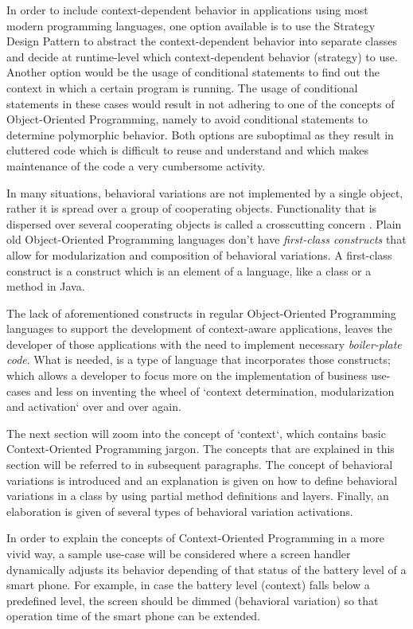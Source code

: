 \documentclass{acm_proc_article-sp}
\begin{document}
In order to include context-dependent behavior in applications using most modern programming languages, one option available is to use the Strategy Design Pattern to abstract the context-dependent behavior into separate classes and decide at runtime-level which context-dependent behavior (strategy) to use. Another option would be the usage of conditional statements to find out the context in which a certain program is running. The usage of conditional statements in these cases would result in not adhering to one of the concepts of Object-Oriented Programming, namely to avoid conditional statements to determine polymorphic behavior. Both options are suboptimal as they result in cluttered code which is difficult to reuse and understand and which makes maintenance of the code a very cumbersome activity.

In many situations, behavioral variations are not implemented by a single object, rather it is spread over a group of cooperating objects. Functionality that is dispersed over several cooperating objects is called a crosscutting concern \cite{kiczalesetallaop}. Plain old Object-Oriented Programming languages don't have \textit{first-class constructs} that allow for modularization and composition of behavioral variations. A first-class construct \cite{Keays:2003:CP:940923.940926} is a construct which is an element of a language, like a class or a method in Java. 

The lack of aforementioned constructs in regular Object-Oriented Programming languages to support the development of context-aware applications, leaves the developer of those applications with the need to implement necessary \textit{boiler-plate code}. What is needed, is a type of language that incorporates those constructs; which allows a developer to focus more on the implementation of business use-cases and less on inventing the wheel of `context determination, modularization and activation` over and over again. 

The next section will zoom into the concept of `context`, which contains basic Context-Oriented Programming jargon. The concepts that are explained in this section will be referred to in subsequent paragraphs. The concept of behavioral variations is introduced and an explanation is given on how to define behavioral variations in a class by using partial method definitions and layers. Finally, an elaboration is given of several types of behavioral variation activations.

In order to explain the concepts of Context-Oriented Programming in a more vivid way, a sample use-case will be considered where a screen handler dynamically adjusts its behavior depending of that status of the battery level of a smart phone. For example, in case the battery level (context) falls below a predefined level, the screen should be dimmed (behavioral variation) so that operation time of the smart phone can be extended.
\end{document}
